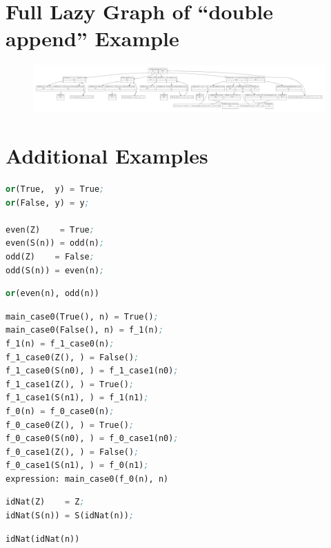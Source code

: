 \documentclass[submission,copyright,creativecommons]{eptcs}
\begin{document}
\clearpage
\section{Full Lazy Graph of ``double append'' Example}\label{app:AppAppGraphSet}

\begin{figure}[H]
  \centering
  \includegraphics[width=0.9\textheight,angle=90]{inc/appAppGraphSet.pdf}
\end{figure}

\clearpage
\section{Additional Examples}\label{app:MoreExapmles}

\begin{lstlisting}[language=Lisp,keywords={},caption=Even-or-odd Program]
or(True,  y) = True;
or(False, y) = y;

even(Z)    = True;
even(S(n)) = odd(n);
odd(Z)    = False;
odd(S(n)) = even(n);
\end{lstlisting}

\begin{lstlisting}[language=Lisp,keywords={},caption=Even-or-odd Expression]
or(even(n), odd(n))
\end{lstlisting}

\begin{lstlisting}[language=Lisp,keywords={},caption=Even-or-odd First/Minimal Result]
main_case0(True(), n) = True();
main_case0(False(), n) = f_1(n);
f_1(n) = f_1_case0(n);
f_1_case0(Z(), ) = False();
f_1_case0(S(n0), ) = f_1_case1(n0);
f_1_case1(Z(), ) = True();
f_1_case1(S(n1), ) = f_1(n1);
f_0(n) = f_0_case0(n);
f_0_case0(Z(), ) = True();
f_0_case0(S(n0), ) = f_0_case1(n0);
f_0_case1(Z(), ) = False();
f_0_case1(S(n1), ) = f_0(n1);
expression: main_case0(f_0(n), n)
\end{lstlisting}

\begin{lstlisting}[language=Lisp,keywords={},caption=idNat Idempotent Program]
idNat(Z)    = Z;
idNat(S(n)) = S(idNat(n));
\end{lstlisting}

\begin{lstlisting}[language=Lisp,keywords={},caption=idNat Idempotent Expression]
idNat(idNat(n))
\end{lstlisting}
\end{document}

